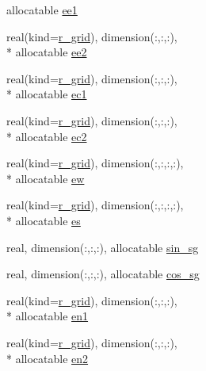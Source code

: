 \begin{DoxyCompactItemize}
allocatable \hyperlink{structfv__arrays__mod_1_1fv__grid__type_a7a3fc16173527ef7fcc38253a91b8106}{ee1}
\item 
real(kind=\hyperlink{classfv__arrays__mod_ab0ba8527d270f349a84fa0a330be1923}{r\-\_\-grid}), dimension(\-:,\-:,\-:), \\*
allocatable \hyperlink{structfv__arrays__mod_1_1fv__grid__type_a95aa43f23d9a854b1375b007d40c0863}{ee2}
\item 
real(kind=\hyperlink{classfv__arrays__mod_ab0ba8527d270f349a84fa0a330be1923}{r\-\_\-grid}), dimension(\-:,\-:,\-:), \\*
allocatable \hyperlink{structfv__arrays__mod_1_1fv__grid__type_a1f29c4a2832b7ee8be140c26901996af}{ec1}
\item 
real(kind=\hyperlink{classfv__arrays__mod_ab0ba8527d270f349a84fa0a330be1923}{r\-\_\-grid}), dimension(\-:,\-:,\-:), \\*
allocatable \hyperlink{structfv__arrays__mod_1_1fv__grid__type_a477b852bca7d25cdabf13895d2c3e69f}{ec2}
\item 
real(kind=\hyperlink{classfv__arrays__mod_ab0ba8527d270f349a84fa0a330be1923}{r\-\_\-grid}), dimension(\-:,\-:,\-:,\-:), \\*
allocatable \hyperlink{structfv__arrays__mod_1_1fv__grid__type_a5ce4965ebb7da8c07d99979b09c34402}{ew}
\item 
real(kind=\hyperlink{classfv__arrays__mod_ab0ba8527d270f349a84fa0a330be1923}{r\-\_\-grid}), dimension(\-:,\-:,\-:,\-:), \\*
allocatable \hyperlink{structfv__arrays__mod_1_1fv__grid__type_a11abc0d80511786eaf04c8218963bb8b}{es}
\item 
real, dimension(\-:,\-:,\-:), allocatable \hyperlink{structfv__arrays__mod_1_1fv__grid__type_adbb06440c855cc37905fd73a908d2ed6}{sin\-\_\-sg}
\item 
real, dimension(\-:,\-:,\-:), allocatable \hyperlink{structfv__arrays__mod_1_1fv__grid__type_a8f95e104b30c7e50479e333e64017993}{cos\-\_\-sg}
\item 
real(kind=\hyperlink{classfv__arrays__mod_ab0ba8527d270f349a84fa0a330be1923}{r\-\_\-grid}), dimension(\-:,\-:,\-:), \\*
allocatable \hyperlink{structfv__arrays__mod_1_1fv__grid__type_a73010b5fc69eb9e3e3369c5b5d1e8e79}{en1}
\item 
real(kind=\hyperlink{classfv__arrays__mod_ab0ba8527d270f349a84fa0a330be1923}{r\-\_\-grid}), dimension(\-:,\-:,\-:), \\*
allocatable \hyperlink{structfv__arrays__mod_1_1fv__grid__type_aeaa021081f07634bebf491c752ebff6a}{en2}

\end{DoxyCompactItemize}
